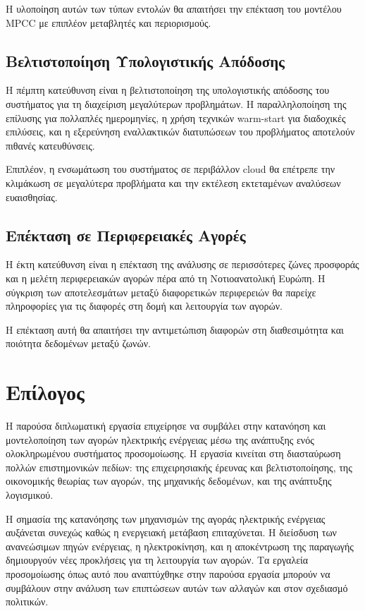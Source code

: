 Η υλοποίηση αυτών των τύπων εντολών θα απαιτήσει την επέκταση του μοντέλου MPCC με επιπλέον μεταβλητές και περιορισμούς.

\subsection{Βελτιστοποίηση Υπολογιστικής Απόδοσης}
\label{subsec:performance-optimization}

Η πέμπτη κατεύθυνση είναι η βελτιστοποίηση της υπολογιστικής απόδοσης του συστήματος για τη διαχείριση μεγαλύτερων προβλημάτων. Η παραλληλοποίηση της επίλυσης για πολλαπλές ημερομηνίες, η χρήση τεχνικών warm-start για διαδοχικές επιλύσεις, και η εξερεύνηση εναλλακτικών διατυπώσεων του προβλήματος αποτελούν πιθανές κατευθύνσεις.

Επιπλέον, η ενσωμάτωση του συστήματος σε περιβάλλον cloud θα επέτρεπε την κλιμάκωση σε μεγαλύτερα προβλήματα και την εκτέλεση εκτεταμένων αναλύσεων ευαισθησίας.

\subsection{Επέκταση σε Περιφερειακές Αγορές}
\label{subsec:regional-extension}

Η έκτη κατεύθυνση είναι η επέκταση της ανάλυσης σε περισσότερες ζώνες προσφοράς και η μελέτη περιφερειακών αγορών πέρα από τη Νοτιοανατολική Ευρώπη. Η σύγκριση των αποτελεσμάτων μεταξύ διαφορετικών περιφερειών θα παρείχε πληροφορίες για τις διαφορές στη δομή και λειτουργία των αγορών.

Η επέκταση αυτή θα απαιτήσει την αντιμετώπιση διαφορών στη διαθεσιμότητα και ποιότητα δεδομένων μεταξύ ζωνών.


\section{Επίλογος}
\label{sec:epilogue}

Η παρούσα διπλωματική εργασία επιχείρησε να συμβάλει στην κατανόηση και μοντελοποίηση των αγορών ηλεκτρικής ενέργειας μέσω της ανάπτυξης ενός ολοκληρωμένου συστήματος προσομοίωσης. Η εργασία κινείται στη διασταύρωση πολλών επιστημονικών πεδίων: της επιχειρησιακής έρευνας και βελτιστοποίησης, της οικονομικής θεωρίας των αγορών, της μηχανικής δεδομένων, και της ανάπτυξης λογισμικού.

Η σημασία της κατανόησης των μηχανισμών της αγοράς ηλεκτρικής ενέργειας αυξάνεται συνεχώς καθώς η ενεργειακή μετάβαση επιταχύνεται. Η διείσδυση των ανανεώσιμων πηγών ενέργειας, η ηλεκτροκίνηση, και η αποκέντρωση της παραγωγής δημιουργούν νέες προκλήσεις για τη λειτουργία των αγορών. Τα εργαλεία προσομοίωσης όπως αυτό που αναπτύχθηκε στην παρούσα εργασία μπορούν να συμβάλουν στην ανάλυση των επιπτώσεων αυτών των αλλαγών και στον σχεδιασμό πολιτικών.

